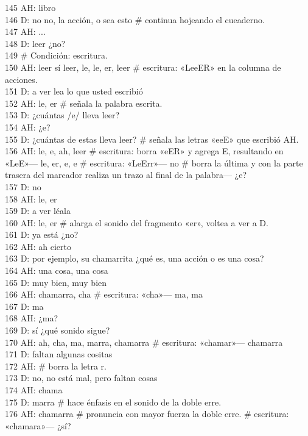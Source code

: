 145 AH: libro\\
146 D: no no, la acción, o sea esto \# continua hojeando el cueaderno.\\
147 AH: ...\\
148 D: leer ¿no?\\
149 \# Condición: escritura.\\
150 AH: leer sí leer, le, le, er, leer \# escritura: «LeeER» en la columna de acciones.\\
151 D: a ver lea lo que usted escribió\\
152 AH: le, er \# señala la palabra escrita.\\
153 D: ¿cuántas /e/ lleva leer?\\
154 AH: ¿e?\\
155 D: ¿cuántas de estas lleva leer? \# señala las letras «eeE» que escribió AH.\\
156 AH: le, e, ah, leer \# escritura: borra «eER» y agrega E, resultando en «LeE»--- le, er, e, e \# escritura: «LeErr»--- no \# borra la última y con la parte trasera del marcador realiza un trazo al final de la palabra--- ¿e?\\
157 D: no\\
158 AH: le, er\\
159 D: a ver léala\\
160 AH: le, er \# alarga el sonido del fragmento «er», voltea a ver a D.\\
161 D: ya está ¿no?\\
162 AH: ah cierto\\
163 D: por ejemplo, su chamarrita ¿qué es, una acción o es una cosa?\\
164 AH: una cosa, una cosa\\
165 D: muy bien, muy bien\\
166 AH: chamarra, cha \# escritura: «cha»--- ma, ma\\
167 D: ma\\
168 AH: ¿ma?\\
169 D: sí ¿qué sonido sigue?\\
170 AH: ah, cha, ma, marra, chamarra \# escritura: «chamar»--- chamarra\\
171 D: faltan algunas cositas\\
172 AH: \# borra la letra r.\\
173 D: no, no está mal, pero faltan cosas\\
174 AH: chama\\
175 D: marra \# hace énfasis en el sonido de la doble erre.\\
176 AH: chamarra \# pronuncia con mayor fuerza la doble erre. \# escritura: «chamara»--- ¿sí?\\
